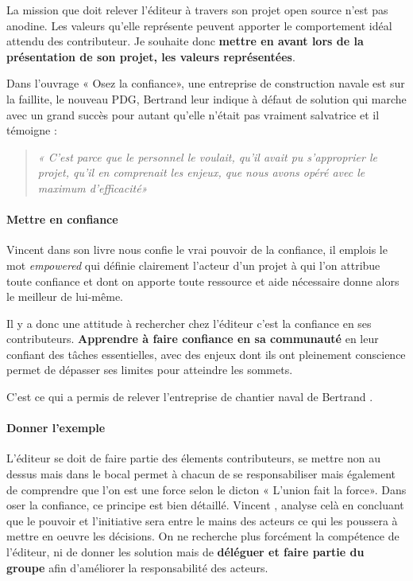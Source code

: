 			La mission que doit relever l'éditeur à travers son projet open source n'est pas anodine. Les valeurs qu'elle représente peuvent apporter le comportement idéal attendu des contributeur. Je souhaite donc \textbf{mettre en avant lors de la présentation de son projet, les valeurs représentées}.

			Dans l'ouvrage « Osez la confiance», une entreprise de construction navale est sur la faillite, le nouveau PDG, Bertrand  leur indique à défaut de solution qui marche avec un grand succès pour autant qu'elle n'était pas vraiment salvatrice et il témoigne :
			\begin{quote}
			\emph{« C'est parce que le personnel le voulait, qu'il avait pu s'approprier le projet, qu'il en comprenait les enjeux, que nous avons opéré avec le maximum d'efficacité»}
			\end{quote}

			\paragraph{Mettre en confiance}

			Vincent  dans son livre nous confie le vrai pouvoir de la confiance, il emplois le mot \emph{empowered} qui définie clairement l'acteur d'un projet à qui l'on attribue toute confiance et dont on apporte toute ressource et aide nécessaire donne alors le meilleur de lui-même.

			Il y a donc une attitude à rechercher chez l'éditeur c'est la confiance en ses contributeurs. \textbf{Apprendre à faire confiance en sa communauté} en leur confiant des tâches essentielles, avec des enjeux dont ils ont pleinement conscience permet de dépasser ses limites pour atteindre les sommets.

			C'est ce qui a permis de relever l'entreprise de chantier naval de Bertrand .

			\paragraph{Donner l'exemple}

			L'éditeur se doit de faire partie des élements contributeurs, se mettre non au dessus mais dans le bocal permet à chacun de se responsabiliser mais également de comprendre que l'on est une force selon le dicton « L'union fait la force». Dans oser la confiance, ce principe est bien détaillé. Vincent , analyse celà en concluant que le pouvoir et l'initiative sera entre le mains des acteurs ce qui les poussera à mettre en oeuvre les décisions. On ne recherche plus forcément la compétence de l'éditeur, ni de donner les solution mais de \textbf{déléguer et faire partie du groupe} afin d'améliorer la responsabilité des acteurs.

